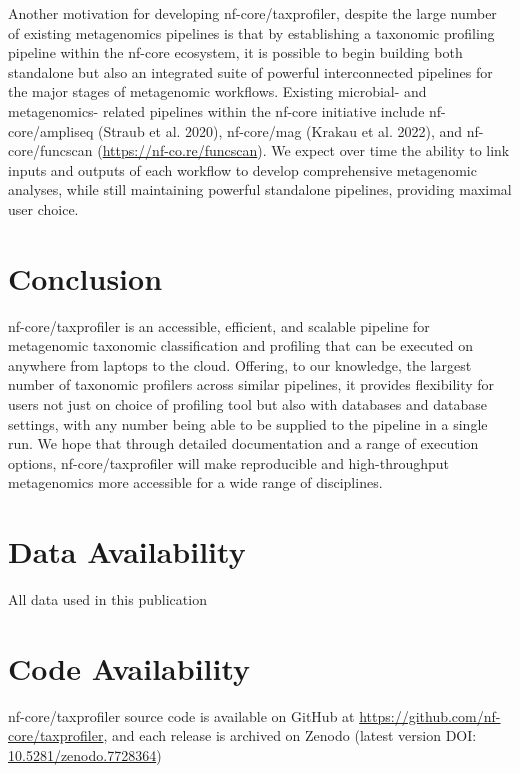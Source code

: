 \documentclass[
]{article}
\begin{document}
Another motivation for developing nf-core/taxprofiler, despite the large
number of existing metagenomics pipelines is that by establishing a
taxonomic profiling pipeline within the nf-core ecosystem, it is
possible to begin building both standalone but also an integrated suite
of powerful interconnected pipelines for the major stages of metagenomic
workflows. Existing microbial- and metagenomics- related pipelines
within the nf-core initiative include nf-core/ampliseq (Straub et al.
2020), nf-core/mag (Krakau et al. 2022), and nf-core/funcscan
(\url{https://nf-co.re/funcscan}). We expect over time the ability to
link inputs and outputs of each workflow to develop comprehensive
metagenomic analyses, while still maintaining powerful standalone
pipelines, providing maximal user choice.

\hypertarget{conclusion}{%
\section{Conclusion}\label{conclusion}}

nf-core/taxprofiler is an accessible, efficient, and scalable pipeline
for metagenomic taxonomic classification and profiling that can be
executed on anywhere from laptops to the cloud. Offering, to our
knowledge, the largest number of taxonomic profilers across similar
pipelines, it provides flexibility for users not just on choice of
profiling tool but also with databases and database settings, with any
number being able to be supplied to the pipeline in a single run. We
hope that through detailed documentation and a range of execution
options, nf-core/taxprofiler will make reproducible and high-throughput
metagenomics more accessible for a wide range of disciplines.

\hypertarget{data-availability}{%
\section{Data Availability}\label{data-availability}}

All data used in this publication

\hypertarget{code-availability}{%
\section{Code Availability}\label{code-availability}}

nf-core/taxprofiler source code is available on GitHub at
\url{https://github.com/nf-core/taxprofiler}, and each release is
archived on Zenodo (latest version DOI:
\href{https://doi.org/10.5281/zenodo.7728364}{10.5281/zenodo.7728364})
\end{document}
